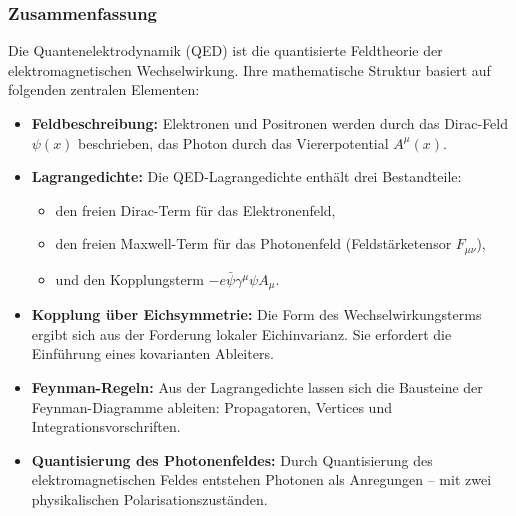 
\subsubsection{Zusammenfassung}

Die Quantenelektrodynamik (QED) ist die quantisierte Feldtheorie der elektromagnetischen Wechselwirkung. Ihre mathematische Struktur basiert auf folgenden zentralen Elementen:

\begin{itemize}
	\item \textbf{Feldbeschreibung:} Elektronen und Positronen werden durch das Dirac-Feld $\psi(x)$ beschrieben, das Photon durch das Viererpotential $A^\mu(x)$.
	
	\item \textbf{Lagrangedichte:} Die QED-Lagrangedichte enthält drei Bestandteile:
	\begin{itemize}
		\item den freien Dirac-Term für das Elektronenfeld,
		\item den freien Maxwell-Term für das Photonenfeld (Feldstärketensor $F_{\mu\nu}$),
		\item und den Kopplungsterm $-e \bar{\psi} \gamma^\mu \psi A_\mu$.
	\end{itemize}
	
	\item \textbf{Kopplung über Eichsymmetrie:} Die Form des Wechselwirkungsterms ergibt sich aus der Forderung lokaler Eichinvarianz. Sie erfordert die Einführung eines kovarianten Ableiters.
	
	\item \textbf{Feynman-Regeln:} Aus der Lagrangedichte lassen sich die Bausteine der Feynman-Diagramme ableiten: Propagatoren, Vertices und Integrationsvorschriften.
	
	\item \textbf{Quantisierung des Photonenfeldes:} Durch Quantisierung des elektromagnetischen Feldes entstehen Photonen als Anregungen – mit zwei physikalischen Polarisationszuständen.
	
\end{itemize}

